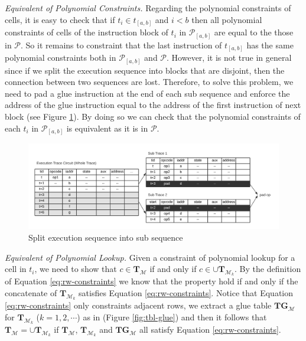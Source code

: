 \noindent\emph{Equivalent of Polynomial Constraints.} Regarding the polynomial constraints of cells, it is easy to check that if $t_i\in t_{[a,b]}$ and $i<b$ then all polynomial constraints of cells of the instruction block of $t_i$ in $\mathcal{P}_{[a,b]}$ are equal to the those in $\mathcal{P}$. So it remains to constraint that the last instruction of $t_{[a,b]}$ has the same polynomial constraints both in $\mathcal{P}_{[a,b]}$ and $\mathcal{P}$. However, it is not true in general since if we split the execution sequence into blocks that are disjoint, then the connection between two sequences are lost. Therefore, to solve this problem, we need to pad a glue instruction at the end of each sub sequence and enforce the address of the glue instruction equal to the address of the first instruction of next block (see Figure \ref{fig:subsequence}). By doing so we can check that the polynomial constraints of each $t_i$ in $\mathcal{P}_{[a,b]}$ is equivalent as it is in $\mathcal{P}$. \\

\begin{figure}[!ht]
\centerline{
\includegraphics[scale=0.6]{figs/subsequence.png}
}
\caption{Split execution sequence into sub sequence}
\label{fig:subsequence}
\end{figure}

\noindent\emph{Equivalent of Polynomial Lookup.} Given a constraint of polynomial lookup for a cell in $t_i$, we need to show that $c \in \mathbf{T}_\mathcal{M}$ if and only if $c \in \cup \mathbf{T}_{\mathcal{M}_{k}}$. By the definition of Equation \ref{eq:rw-constraints} we know that the property hold if and only if the concatenate of $\mathbf{T}_{\mathcal{M}_k}$ satisfies Equation \ref{eq:rw-constraints}. Notice that Equation \ref{eq:rw-constraints} only constraints adjacent rows, we extract a glue table $\mathbf{TG}_\mathcal{M}$ for $\mathbf{T}_{\mathcal{M}_{k}}$ ($k = 1,2,\cdots$) as in (Figure \ref{fig:tbl-glue}) and then it follows that $\mathbf{T}_\mathcal{M} = \cup \mathbf{T}_{\mathcal{M}_{k}}$ if $\mathbf{T}_\mathcal{M}$, $\mathbf{T}_{\mathcal{M}_{k}}$ and $\mathbf{TG}_\mathcal{M}$ all satisfy Equation \ref{eq:rw-constraints}.

